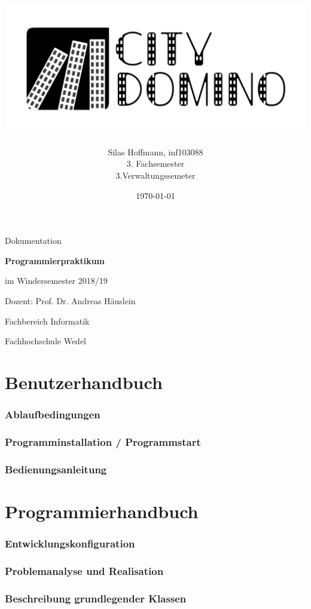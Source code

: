 \documentclass[a4paper, 11pt]{scrartcl}
\title{\includegraphics[width=\linewidth]{pics/LogoIconLargeV1}}
\author{Silas Hoffmann, inf103088
\normalsize
\\3. Fachsemester
\\3.Verwaltungssemeter}
\date{\today}
\begin{document}
\maketitle

\vfill
\begin{center}
	Dokumentation
	
	\vspace{0.5cm}
	\Large
	\textbf{Programmierpraktikum}
	\normalsize
	
	\vspace{0.3cm}
	im Windersemester 2018/19
	
	\vspace{0.5cm}
	Dozent: Prof. Dr. Andreas Häuslein
	
	\vfill
	\small
	Fachbereich Informatik
	
	\vspace{0.3cm}
	Fachhochschule Wedel
\end{center}
\thispagestyle{empty}
\restoregeometry

\newpage
\tableofcontents
\newpage


\part{Benutzerhandbuch}
\section{Ablaufbedingungen}
\section{Programminstallation / Programmstart}
\section{Bedienungsanleitung}

\clearpage
\part{Programmierhandbuch}
\section{Entwicklungskonfiguration}
\section{Problemanalyse und Realisation}
\section{Beschreibung grundlegender Klassen}
\end{document}
